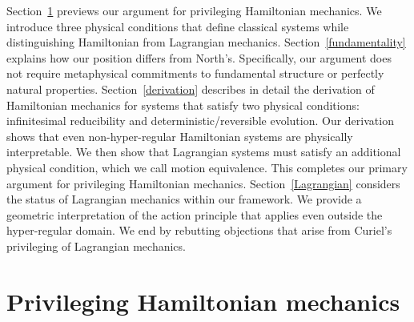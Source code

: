 \documentclass[12pt, twoside]{article}
\begin{document}
Section~\ref{privileging} previews our argument for privileging Hamiltonian mechanics. We introduce three physical conditions that define classical systems while distinguishing Hamiltonian from Lagrangian mechanics. Section~\ref{fundamentality} explains how our position differs from North's. Specifically, our argument does not require metaphysical commitments to fundamental structure or perfectly natural properties. Section~\ref{derivation} describes in detail the derivation of Hamiltonian mechanics for systems that satisfy two physical conditions: infinitesimal reducibility and deterministic/reversible evolution. {\color{green} Our derivation shows that even non-hyper-regular Hamiltonian systems are physically interpretable.} We then show that Lagrangian systems must satisfy an additional physical condition, which we call motion equivalence. This completes our primary argument for privileging Hamiltonian mechanics. Section~\ref{Lagrangian} considers the status of Lagrangian mechanics within our framework. We provide a geometric interpretation of the action principle that applies even outside the hyper-regular domain. We end by rebutting objections that arise from Curiel's \parencites*[]{Curiel} privileging of Lagrangian mechanics. 


\section{Privileging Hamiltonian mechanics}
\label{privileging}
\end{document}
